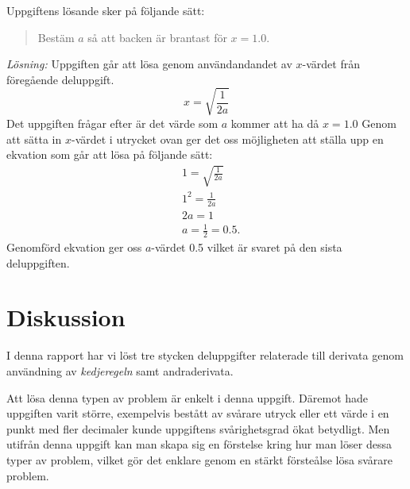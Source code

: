 \documentclass[a4paper,12pt]{article}
\begin{document}
Uppgiftens lösande sker på följande sätt:
%
\begin{quote}
  Bestäm $a$ så att backen är brantast för $x=1.0$.
\end{quote}
%
\emph{Lösning:} Uppgiften går att lösa genom  användandandet av $x$-värdet
från föregående deluppgift.
%
\begin{displaymath} 
  x=\sqrt{\frac{1}{2a}}
\end{displaymath}
%
Det uppgiften frågar efter är det värde som $a$ kommer att ha då $x=1.0$
Genom att sätta in $x$-värdet i utrycket ovan
ger det oss möjligheten att ställa upp en ekvation som går att lösa på 
följande sätt:
%
\begin{align*} 
  &1=\sqrt{\frac{1}{2a}}\\
  &1^2=\frac{1}{2a}\\
  &2a=1\\
  &a = \frac{1}{2}=0.5.\label{eq:2}
\end{align*}
%
Genomförd ekvation ger oss $a$-värdet 0.5 vilket är svaret på den sista deluppgiften. 


\section{Diskussion}
\label{sec:disk}


I denna rapport har vi löst tre stycken deluppgifter relaterade till derivata genom
användning av \emph{kedjeregeln} samt andraderivata.

Att lösa denna typen av problem är enkelt i denna uppgift. Däremot hade uppgiften
varit större, exempelvis bestått av svårare utryck eller ett värde i en punkt med 
fler decimaler kunde uppgiftens svårighetsgrad ökat betydligt. Men utifrån denna
uppgift kan man skapa sig en förstelse kring hur man löser dessa typer av problem,
vilket gör det enklare genom en stärkt försteålse lösa svårare problem.
%
\end{document}
